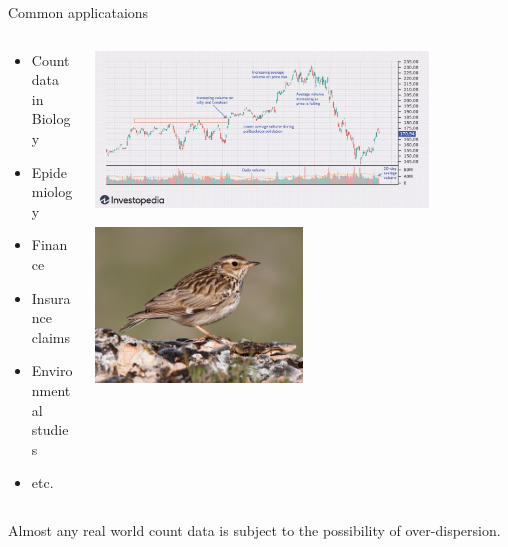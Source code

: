 \documentclass[
  ignorenonframetext,
]{beamer}
\providecommand{\tightlist}{%
  \setlength{\itemsep}{0pt}\setlength{\parskip}{0pt}}\usepackage{longtable,booktabs,array}
\begin{document}
\begin{frame}{Common applicataions}
\protect\hypertarget{common-applicataions}{}
\begin{columns}[T]
\begin{column}{0.5\textwidth}
\begin{itemize}
\tightlist
\item
  Count data in Biology
\item
  Epidemiology
\item
  Finance
\item
  Insurance claims
\item
  Environmental studies
\item
  etc.
\end{itemize}
\end{column}

\begin{column}{0.5\textwidth}
\begin{center}
\includegraphics[width=0.8\textwidth,height=\textheight]{daily_stock_trades.png}
\end{center}

\begin{center}
\includegraphics[width=0.5\textwidth,height=\textheight]{woodlark.png}
\end{center}
\end{column}
\end{columns}

Almost any real world count data is subject to the possibility of
over-dispersion.
\end{frame}
\end{document}
